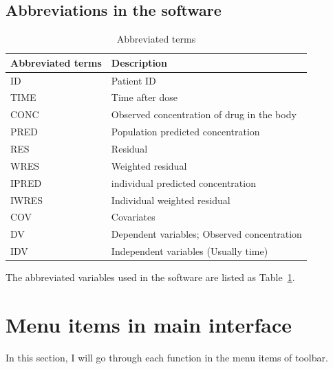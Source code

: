\documentclass[a4paper]{article}
\begin{document}
\subsection{Abbreviations in the software}
\begin{table}[h!tb] \centering
\begin{tabular}{l l} \hline
\textbf{ Abbreviated terms} & \textbf{Description}  \\ \hline
ID & Patient ID \\
TIME & Time after dose \\
CONC & Observed concentration of drug in the body \\
PRED & Population predicted concentration \\
RES & Residual \\
WRES & Weighted residual \\
IPRED & individual predicted concentration \\
IWRES & Individual weighted residual \\
COV & Covariates \\ 
DV & Dependent variables; Observed concentration \\
IDV & Independent variables (Usually time) \\
\hline
\end{tabular}
\caption{Abbreviated terms}
\label{tnew_function_1}
\end{table}
The abbreviated variables used in the software are listed as Table~\ref{tnew_function_1}.

\section{Menu items in main interface}
In this section, I will go through each function in the menu items of toolbar.
\end{document}
